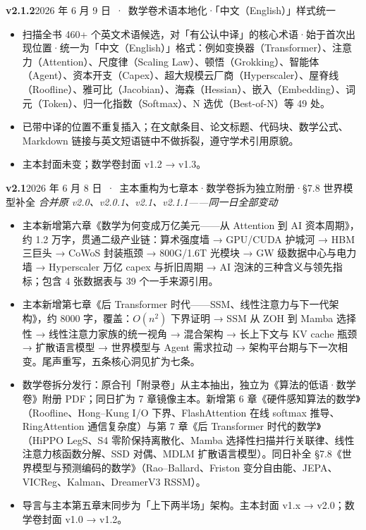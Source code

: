 {  \vspace{1em}
  \noindent\textbf{\color{teal1}v2.1.2\quad}{\small\color{gray}2026 年 6 月 9 日 \,·\, 数学卷术语本地化·「中文（English）」样式统一}
  \begin{itemize}\setlength\itemsep{0.25em}
    \item 扫描全书 460+ 个英文术语候选，对「有公认中译」的核心术语·始于首次出现位置·统一为「中文（English）」格式：例如变换器（Transformer）、注意力（Attention）、尺度律（Scaling Law）、顿悟（Grokking）、智能体（Agent）、资本开支（Capex）、超大规模云厂商（Hyperscaler）、屋脊线（Roofline）、雅可比（Jacobian）、海森（Hessian）、嵌入（Embedding）、词元（Token）、归一化指数（Softmax）、N 选优（Best-of-N）等 49 处。
    \item 已带中译的位置不重复插入；在文献条目、论文标题、代码块、数学公式、Markdown 链接与英文短语链中不做拆裂，遵守学术引用原貌。
    \item 主本封面未变；数学卷封面 v1.2 → v1.3。
  \end{itemize}

  \vspace{1em}
  \noindent\textbf{\color{teal1}v2.1\quad}{\small\color{gray}2026 年 6 月 8 日 \,·\, 主本重构为七章本·数学卷拆为独立附册·§7.8 世界模型补全}
  {\small\color{gray}\itshape\quad 合并原 v2.0、v2.0.1、v2.1、v2.1.1——同一日全部变动}
  \begin{itemize}\setlength\itemsep{0.25em}
    \item 主本新增第六章《数学为何变成万亿美元——从 Attention 到 AI 资本周期》，约 1.2 万字，贯通二级产业链：算术强度墙 → GPU/CUDA 护城河 → HBM 三巨头 → CoWoS 封装瓶颈 → 800G/1.6T 光模块 → GW 级数据中心与电力墙 → Hyperscaler 万亿 capex 与折旧周期 → AI 泡沫的三种含义与领先指标；包含 4 张数据表与 39 个一手来源引用。
    \item 主本新增第七章《后 Transformer 时代——SSM、线性注意力与下一代架构》，约 8000 字，覆盖：\(O(n^2)\) 下界证明 → SSM 从 ZOH 到 Mamba 选择性 → 线性注意力家族的统一视角 → 混合架构 → 长上下文与 KV cache 瓶颈 → 扩散语言模型 → 世界模型与 Agent 需求拉动 → 架构平台期与下一次相变。尾声重写，五条核心洞见扩为七条。
    \item 数学卷拆分发行：原合刊「附录卷」从主本抽出，独立为《算法的低语·数学卷》附册 PDF；同日扩为 7 章镜像主本。新增第 6 章《硬件感知算法的数学》（Roofline、Hong–Kung I/O 下界、FlashAttention 在线 softmax 推导、RingAttention 通信复杂度）与第 7 章《后 Transformer 时代的数学》（HiPPO LegS、S4 零阶保持离散化、Mamba 选择性扫描并行关联律、线性注意力核函数分解、SSD 对偶、MDLM 扩散语言模型）。同日补全 §7.8《世界模型与预测编码的数学》（Rao–Ballard、Friston 变分自由能、JEPA、VICReg、Kalman、DreamerV3 RSSM）。
    \item 导言与主本第五章末同步为「上下两半场」架构。主本封面 v1.x → v2.0；数学卷封面 v1.0 → v1.2。
  \end{itemize}

}
